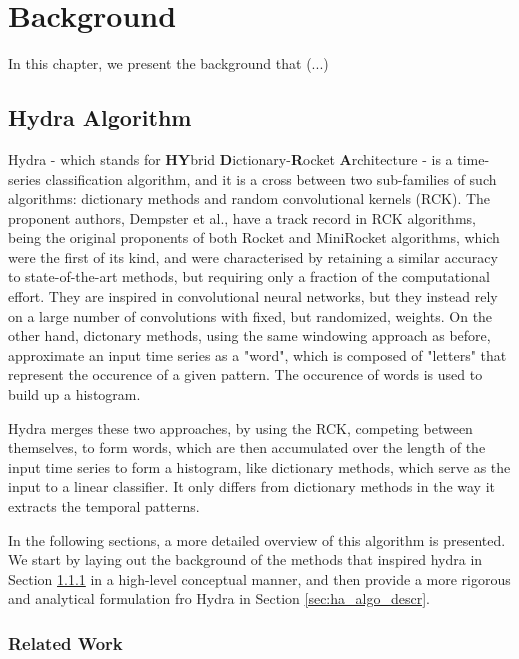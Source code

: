 \chapter{Background}
\label{ch:background}

In this chapter, we present the background that (...)

\section{Hydra Algorithm}
\label{sec:hydra_algo}
Hydra \cite{Dempster2023Hydra} - which stands for \textbf{HY}brid \textbf{D}ictionary-\textbf{R}ocket \textbf{A}rchitecture - is a time-series classification algorithm, and it is a cross between two sub-families of such algorithms: dictionary methods and random convolutional kernels (RCK).
The proponent authors, Dempster et al., have a track record in RCK algorithms, being the original proponents of both Rocket \cite{Dempster2020} and MiniRocket \cite{Dempster2021MR} algorithms, which were the first of its kind,
and were characterised by retaining a similar accuracy to state-of-the-art methods, but requiring only a fraction of the computational effort. They are inspired in convolutional neural networks, but they instead rely on a large number of convolutions with fixed, but randomized, weights.
On the other hand, dictonary methods, using the same windowing approach as before, approximate an input time series as a "word", which is composed of "letters" that represent the occurence of a given pattern. The occurence of words is used to build up a histogram.

Hydra merges these two approaches, by using the RCK, competing between themselves, to form words, which are then accumulated over the length of the input time series to form a histogram, like dictionary methods, which serve as the input to a linear classifier. It only differs from dictionary methods
in the way it extracts the temporal patterns.

In the following sections, a more detailed overview of this algorithm is presented. We start by laying out the background of the methods that inspired hydra in Section \ref{sec:ha_related_work} in a high-level conceptual manner, and then provide a more rigorous and analytical formulation fro Hydra in Section \ref{sec:ha_algo_descr}.

\subsection{Related Work}\label{sec:ha_related_work}
